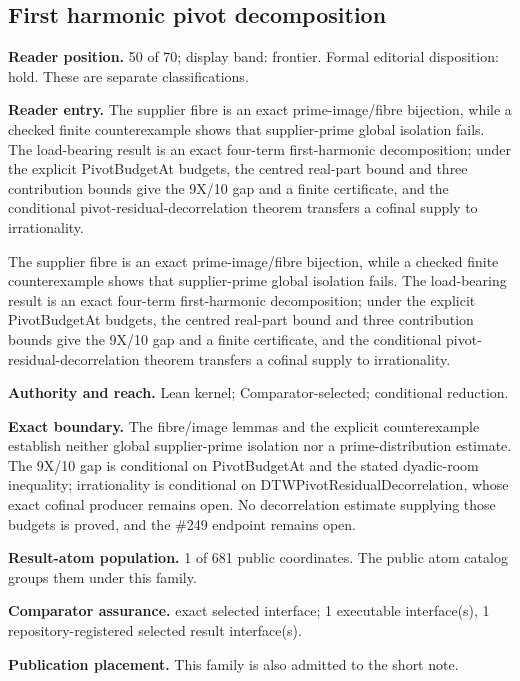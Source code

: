 \subsection{First harmonic pivot decomposition}
\textbf{Reader position.} 50 of 70; display band: frontier.  Formal editorial disposition: hold.  These are separate classifications.

\textbf{Reader entry.} The supplier fibre is an exact prime-image/fibre bijection, while a checked finite counterexample shows that supplier-prime global isolation fails. The load-bearing result is an exact four-term first-harmonic decomposition; under the explicit PivotBudgetAt budgets, the centred real-part bound and three contribution bounds give the 9X/10 gap and a finite certificate, and the conditional pivot-residual-decorrelation theorem transfers a cofinal supply to irrationality.

The supplier fibre is an exact prime-image/fibre bijection, while a checked finite counterexample shows that supplier-prime global isolation fails. The load-bearing result is an exact four-term first-harmonic decomposition; under the explicit PivotBudgetAt budgets, the centred real-part bound and three contribution bounds give the 9X/10 gap and a finite certificate, and the conditional pivot-residual-decorrelation theorem transfers a cofinal supply to irrationality.

\textbf{Authority and reach.} Lean kernel; Comparator-selected; conditional reduction.

\textbf{Exact boundary.} The fibre/image lemmas and the explicit counterexample establish neither global supplier-prime isolation nor a prime-distribution estimate. The 9X/10 gap is conditional on PivotBudgetAt and the stated dyadic-room inequality; irrationality is conditional on DTWPivotResidualDecorrelation, whose exact cofinal producer remains open. No decorrelation estimate supplying those budgets is proved, and the \#249 endpoint remains open.

\textbf{Result-atom population.} 1 of 681 public coordinates. The public atom catalog groups them under this family.

\textbf{Comparator assurance.} exact selected interface; 1 executable interface(s), 1 repository-registered selected result interface(s).

\textbf{Publication placement.} This family is also admitted to the short note.

